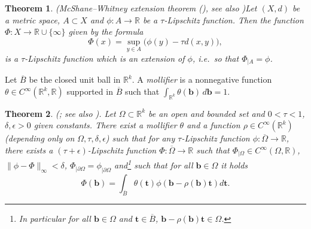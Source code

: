 \documentclass[11pt]{article}
\theoremstyle{plain}
\newtheorem{thm}{Theorem}[section]
\theoremstyle{definition}
\def\R{\mathbb{R}}
\def\Rk{\mathbb{R}^k}
\def\tt{\mathbf t}
\def\bb{\mathbf b}
\numberwithin{figure}{section}
\begin{document}
\begin{thm}(McShane--Whitney extension theorem (\cite{McSHANE1934ExtensionOR,whitney1934AnalyticEO}), see also \cite[Theorem 2.3]{gutev2020lipschitz})\label{thm:Lip_Ext}
     Let $(X,d)$ be a metric space, $A\subset  X$ and $\phi : A\rightarrow \R$ be a $\tau$-Lipschitz function. Then the function $\Phi : X \rightarrow \R\cup \{\infty\}$ given by the formula
     \begin{equation*}
        \Phi(x)=\sup\limits_{y\in A}\big(\phi(y)-\tau d(x,y)\big),
    \end{equation*}
     is  a $\tau$-Lipschitz function  which is an extension of $\phi$, i.e.\ so that $\Phi_{|A}=\phi$.
\end{thm}
\noindent
Let $\overline{B}$ be the closed unit ball in $\Rk$. A \textit{mollifier} is a nonnegative function $\theta \in C^\infty(\Rk,\R)$ supported in $\overline{B}$  such that $\int_{\Rk} \theta(\bb) \, d\bb = 1$.
\begin{thm}\label{thm:Lip_C_infty}(\cite[Proposition 4.1]{czarnecki2006approximation}; see also \cite[p. 887]{deville2019approximation}).
Let  $\Omega\subset  \R^k$ be an open and bounded set and $0<\tau<1$, $\delta, \epsilon>0$ given constants. There exist  a mollifier $\theta$ and a function $\rho\in C^\infty(\Rk)$ (depending only on $\Omega,\tau, \delta, \epsilon$) such that for any $\tau$-Lipschitz function $\phi : \overline{\Omega}\rightarrow \R$, there exists a $(\tau+\epsilon)$-Lipschitz function $\Phi: \overline{\Omega}\rightarrow \R$ such that $\Phi_{|\Omega}\in C^\infty(\Omega, \R)$, $\|\phi-\Phi\|_{\infty}<\delta$, $\Phi_{|\partial \Omega}=\phi_{|\partial \Omega}$ and\footnote{In particular for all $\bb\in \Omega$ and $\tt\in \overline{B}$, $ \bb-\rho(\bb)\tt\in \Omega$.}  such that for all  $\bb\in \Omega$ it holds
\begin{equation}\label{eq:Phi}
 \Phi(\bb)=\int_{\overline{B}} \theta(\tt)\phi(\bb-\rho(\bb)\tt) d\tt.
\end{equation}

\end{thm}
\end{document}

